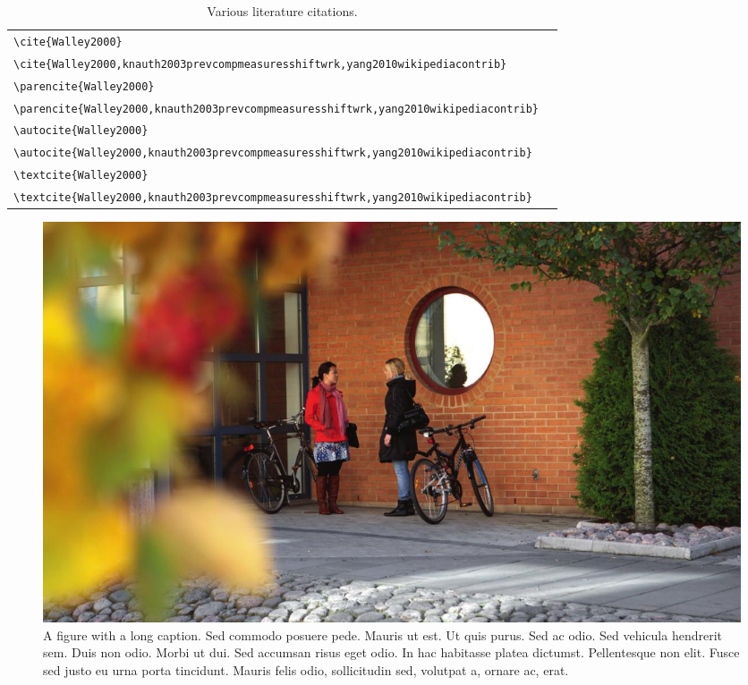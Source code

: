 \begin{table}
\caption{Various literature citations.}
\begin{tabular}{L{.6\linewidth}L{.3\linewidth}}%
\toprule%
\lstinline|\cite{Walley2000}| & \cite{Walley2000} \\[0.5em]%
\lstinline|\cite{Walley2000,knauth2003prevcompmeasuresshiftwrk,yang2010wikipediacontrib}| & \cite{Walley2000,knauth2003prevcompmeasuresshiftwrk,yang2010wikipediacontrib} \\
\midrule%
\lstinline|\parencite{Walley2000}| & \parencite{Walley2000} \\[0.5em]%
\lstinline|\parencite{Walley2000,knauth2003prevcompmeasuresshiftwrk,yang2010wikipediacontrib}| & \parencite{Walley2000,knauth2003prevcompmeasuresshiftwrk,yang2010wikipediacontrib} \\
\midrule%
\lstinline|\autocite{Walley2000}| & \autocite{Walley2000} \\[0.5em]%
\lstinline|\autocite{Walley2000,knauth2003prevcompmeasuresshiftwrk,yang2010wikipediacontrib}| & \autocite{Walley2000,knauth2003prevcompmeasuresshiftwrk,yang2010wikipediacontrib} \\
\midrule%
\lstinline|\textcite{Walley2000}| & \textcite{Walley2000} \\[0.5em]%
\lstinline|\textcite{Walley2000,knauth2003prevcompmeasuresshiftwrk,yang2010wikipediacontrib}| & \textcite{Walley2000,knauth2003prevcompmeasuresshiftwrk,yang2010wikipediacontrib} \\
\bottomrule%
\end{tabular}%
\label{tab:citations}
\end{table}

\begin{figure}
\centering
\includegraphics[width=\textwidth]{template/foto.jpg}
\caption{A figure with a long caption. Sed commodo posuere pede. Mauris ut est. Ut quis purus. Sed ac odio.
Sed vehicula hendrerit sem. Duis non odio. Morbi ut dui. Sed accumsan risus eget odio.
In hac habitasse platea dictumst. Pellentesque non elit. Fusce sed justo eu urna porta tincidunt.
Mauris felis odio, sollicitudin sed, volutpat a, ornare ac, erat.}
\label{fig:first_figure}
\end{figure}

